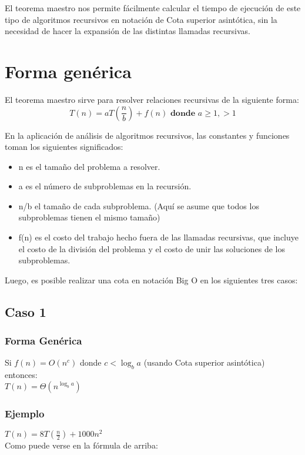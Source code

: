 \documentclass{article}
\begin{document}
El teorema maestro nos permite fácilmente calcular el tiempo de ejecución de este tipo de algoritmos recursivos en notación de Cota superior asintótica, sin la necesidad de hacer la expansión de las distintas llamadas recursivas.
\section{Forma genérica}
El teorema maestro sirve para resolver relaciones recursivas de la siguiente forma:
\begin{equation}
    T(n)=aT\left({\frac {n}{b}}\right)+f(n) \textbf{ donde } a\geq 1,>1
\end{equation}
 
En la aplicación de análisis de algoritmos recursivos, las constantes y funciones toman los siguientes significados:
\begin{itemize}
    \item n es el tamaño del problema a resolver.
    \item a es el número de subproblemas en la recursión.
    \item n/b el tamaño de cada subproblema. (Aquí se asume que todos los subproblemas tienen el mismo tamaño)
    \item f(n) es el costo del trabajo hecho fuera de las llamadas recursivas, que incluye el costo de la división del problema y el costo de unir las soluciones de los subproblemas.
\end{itemize}
Luego, es posible realizar una cota en notación Big O en los siguientes tres casos:


\subsection{Caso 1}

        \subsubsection{Forma Genérica}
        Si $f(n)=O\left(n^{c}\right)$ donde  $c<\log _{b}a$ (usando Cota superior asintótica)\\
        entonces:\\
        $T(n)=\Theta \left(n^{\log _{b}a}\right)$

        \subsubsection{Ejemplo}
        $T(n)=8T\left({\frac {n}{2}}\right)+1000n^{2}$\\
        Como puede verse en la fórmula de arriba:\\
\end{document}
